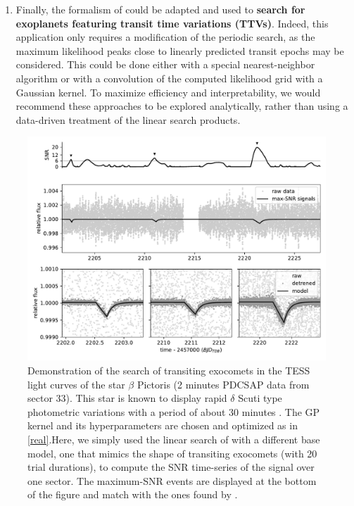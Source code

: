 \documentclass[modern]{aastex631}
\begin{document}
\begin{enumerate}
    \item Finally, the formalism of \nuancemethod{} could be adapted and used to \textbf{search for exoplanets featuring transit time variations (TTVs)}. Indeed, this application only requires a modification of the periodic search, as the maximum likelihood peaks close to linearly predicted transit epochs may be considered. This could be done either with a special nearest-neighbor algorithm or with a convolution of the computed likelihood grid with a Gaussian kernel. To maximize efficiency and interpretability, we would recommend these approaches to be explored analytically, rather than using a data-driven treatment of the linear search products.
\end{enumerate}
\begin{figure}[H]    
    \includegraphics[width=\linewidth]{exocomet.pdf}
    \caption{Demonstration of the search of transiting exocomets in the TESS light curves of the star $\beta$ Pictoris (2 minutes PDCSAP data from sector 33). This star is known to display rapid $\delta$ Scuti type photometric variations with a period of about 30 minutes \citep{Lecavelier2022}. The GP kernel and its hyperparameters are chosen and optimized as in \autoref{real}.Here, we simply used the linear search of \nuancecode{} with a different base model, one that mimics the shape of transiting exocomets (with 20 trial durations), to compute the SNR time-series of the signal over one sector. The maximum-SNR events are displayed at the bottom of the figure and match with the ones found by \cite{Lecavelier2022}. }
    \label{fig:exoco} 
\end{figure}
\end{document}
